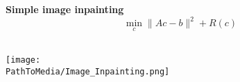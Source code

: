 \begin{frame}
	~\\~\\
	\textbf{Simple image inpainting}\\
	$$\min_c \|Ac-b\|^2 + R(c)$$\\ \centering
	\begin{center}
		\hspace*{-0.3cm}	\texttt{[image: \\PathToMedia/Image\_Inpainting.png]}
	\end{center}
\end{frame}





